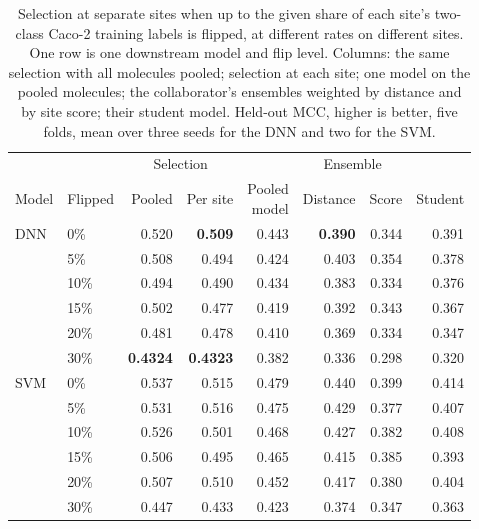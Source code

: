 \begin{table}[htbp]
\centering
\begin{tabular}{@{}llrrrrrr@{}}
\toprule
& & \multicolumn{2}{c}{Selection} & & \multicolumn{2}{c}{Ensemble} & \\
\cmidrule(lr){3-4}\cmidrule(lr){6-7}
Model & Flipped & Pooled & Per site & \makecell[r]{Pooled\\model} & Distance & Score & Student \\
\midrule
DNN & 0\% & 0.520 & \textbf{0.509} & 0.443 & \textbf{0.390} & 0.344 & 0.391 \\
 & 5\% & 0.508 & 0.494 & 0.424 & 0.403 & 0.354 & 0.378 \\
 & 10\% & 0.494 & 0.490 & 0.434 & 0.383 & 0.334 & 0.376 \\
 & 15\% & 0.502 & 0.477 & 0.419 & 0.392 & 0.343 & 0.367 \\
 & 20\% & 0.481 & 0.478 & 0.410 & 0.369 & 0.334 & 0.347 \\
 & 30\% & \textbf{0.4324} & \textbf{0.4323} & 0.382 & 0.336 & 0.298 & 0.320 \\
SVM & 0\% & 0.537 & 0.515 & 0.479 & 0.440 & 0.399 & 0.414 \\
 & 5\% & 0.531 & 0.516 & 0.475 & 0.429 & 0.377 & 0.407 \\
 & 10\% & 0.526 & 0.501 & 0.468 & 0.427 & 0.382 & 0.408 \\
 & 15\% & 0.506 & 0.495 & 0.465 & 0.415 & 0.385 & 0.393 \\
 & 20\% & 0.507 & 0.510 & 0.452 & 0.417 & 0.380 & 0.404 \\
 & 30\% & 0.447 & 0.433 & 0.423 & 0.374 & 0.347 & 0.363 \\
\bottomrule
\end{tabular}
\caption[Selection at sites with flipped labels on Caco-2.]{Selection at separate sites when up to the given share of each site's two-class Caco-2 training labels is flipped, at different rates on different sites. One row is one downstream model and flip level. Columns: the same selection with all molecules pooled; selection at each site; one model on the pooled molecules; the collaborator's ensembles weighted by distance and by site score; their student model. Held-out MCC, higher is better, five folds, mean over three seeds for the DNN and two for the SVM.}
\label{tab:method:flipped_sites}
\end{table}


